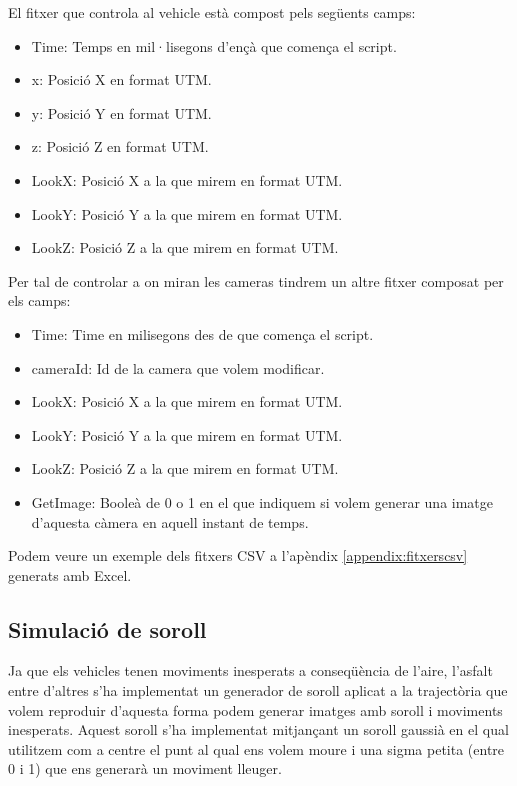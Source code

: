 \documentclass[10pt,a4paper,twocolumn,twoside]{article}
\begin{document}
El fitxer que controla al vehicle està compost pels següents camps:

\begin{itemize}
\item Time: Temps en mil·lisegons d'ençà que comença el script.
\item x: Posició X en format UTM.
\item y: Posició Y en format UTM.
\item z: Posició Z en format UTM.
\item LookX: Posició X a la que mirem en format UTM.
\item LookY: Posició Y a la que mirem en format UTM.
\item LookZ: Posició Z a la que mirem en format UTM.
\end{itemize}

Per tal de controlar a on miran les cameras tindrem un altre fitxer composat per els camps:

\begin{itemize}
\item Time: Time en milisegons des de que comença el script.
\item cameraId: Id de la camera que volem modificar.
\item LookX: Posició X a la que mirem en format UTM.
\item LookY: Posició Y a la que mirem en format UTM.
\item LookZ: Posició Z a la que mirem en format UTM.
\item GetImage: Booleà de 0 o 1 en el que indiquem si volem generar una imatge d'aquesta càmera en aquell instant de temps.
\end{itemize}

Podem veure un exemple dels fitxers CSV a l'apèndix \ref{appendix:fitxerscsv} generats amb Excel.

\subsection{Simulació de soroll}
Ja que els vehicles tenen moviments inesperats a conseqüència de l'aire, l'asfalt entre d'altres s'ha implementat un generador de soroll aplicat a la trajectòria que volem reproduir d'aquesta forma podem generar imatges amb soroll i moviments inesperats. Aquest soroll s'ha implementat mitjançant un soroll gaussià en el qual utilitzem com a centre el punt al qual ens volem moure i una sigma petita (entre 0 i 1) que ens generarà un moviment lleuger.
\end{document}
